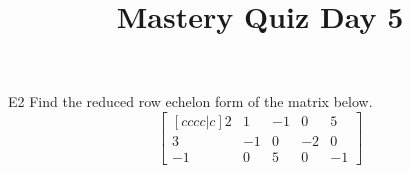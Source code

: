 \documentclass{sbgLAquiz}
\title{Mastery Quiz Day 5 }
\begin{document}
\begin{problem}{E2}
Find the reduced row echelon form of the matrix below.
$$\begin{bmatrix}[cccc|c] 2 & 1 & -1 & 0 & 5 \\ 3 & -1 & 0 & -2 & 0 \\ -1 & 0 & 5 & 0 & -1 \end{bmatrix}$$
\end{problem}
\end{document}
